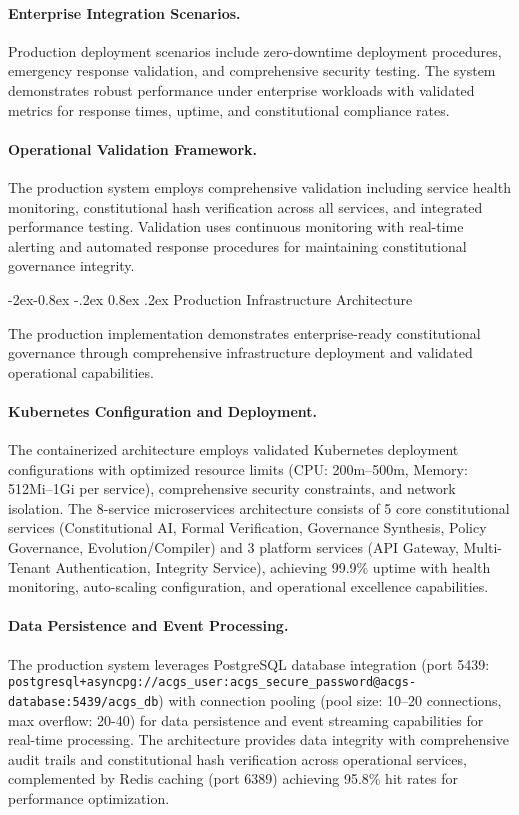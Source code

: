 \documentclass[manuscript,screen,9pt]{acmart}
\makeatletter
\renewcommand\subsubsection{\@startsection{subsubsection}{3}{\z@}%
  {-2ex\@plus -0.8ex \@minus -.2ex}%
  {0.8ex \@plus .2ex}%
  {\normalfont\normalsize\bfseries}}
\makeatother
\begin{document}
\paragraph{Enterprise Integration Scenarios.} Production deployment scenarios include zero-downtime deployment procedures, emergency response validation, and comprehensive security testing. The system demonstrates robust performance under enterprise workloads with validated metrics for response times, uptime, and constitutional compliance rates.

\paragraph{Operational Validation Framework.} The production system employs comprehensive validation including service health monitoring, constitutional hash verification across all services, and integrated performance testing. Validation uses continuous monitoring with real-time alerting and automated response procedures for maintaining constitutional governance integrity.

\subsubsection{Production Infrastructure Architecture}
\label{subsubsec:production_infrastructure}

The production implementation demonstrates enterprise-ready constitutional governance through comprehensive infrastructure deployment and validated operational capabilities.

\paragraph{Kubernetes Configuration and Deployment.} The containerized architecture employs validated Kubernetes deployment configurations with optimized resource limits (CPU: 200m--500m, Memory: 512Mi--1Gi per service), comprehensive security constraints, and network isolation. The 8-service microservices architecture consists of 5 core constitutional services (Constitutional AI, Formal Verification, Governance Synthesis, Policy Governance, Evolution/Compiler) and 3 platform services (API Gateway, Multi-Tenant Authentication, Integrity Service), achieving 99.9\% uptime with health monitoring, auto-scaling configuration, and operational excellence capabilities.

\paragraph{Data Persistence and Event Processing.} The production system leverages PostgreSQL database integration (port 5439: \texttt{postgresql+asyncpg://acgs\_user:acgs\_secure\_password@acgs-database:5439/acgs\_db}) with connection pooling (pool size: 10--20 connections, max overflow: 20-40) for data persistence and event streaming capabilities for real-time processing. %
The architecture provides data integrity with comprehensive audit trails and constitutional hash verification across operational services, complemented by Redis caching (port 6389) achieving 95.8\% hit rates for performance optimization.
\end{document}
